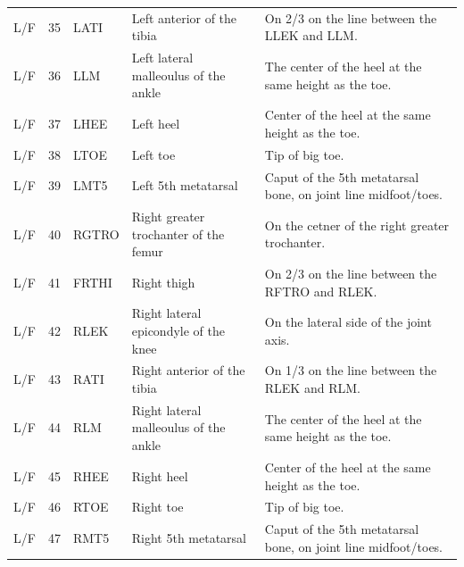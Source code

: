 \documentclass[fleqn,12pt]{wlpeerj}
\begin{document}
\begin{table}
\begin{tabular}{lrlll}
    L/F & 35 & LATI  & Left anterior of the tibia            & On 2/3 on the line between the LLEK and LLM. \\
    L/F & 36 & LLM   & Left lateral malleoulus of the ankle  & The center of the heel at the same height as the toe. \\
    L/F & 37 & LHEE  & Left heel                             & Center of the heel at the same height as the toe. \\
    L/F & 38 & LTOE  & Left toe                              & Tip of big toe. \\
    L/F & 39 & LMT5  & Left 5th metatarsal                   & Caput of the 5th metatarsal bone, on joint line midfoot/toes. \\
    L/F & 40 & RGTRO & Right greater trochanter of the femur & On the cetner of the right greater trochanter. \\
    L/F & 41 & FRTHI & Right thigh                           & On 2/3 on the line between the RFTRO and RLEK. \\
    L/F & 42 & RLEK  & Right lateral epicondyle of the knee  & On the lateral side of the joint axis. \\
    L/F & 43 & RATI  & Right anterior of the tibia           & On 1/3 on the line between the RLEK and RLM. \\
    L/F & 44 & RLM   & Right lateral malleoulus of the ankle & The center of the heel at the same height as the toe. \\
    L/F & 45 & RHEE  & Right heel                            & Center of the heel at the same height as the toe. \\
    L/F & 46 & RTOE  & Right toe                             & Tip of big toe. \\
    L/F & 47 & RMT5  & Right 5th metatarsal                  & Caput of the 5th metatarsal bone, on joint line midfoot/toes. \\
    \bottomrule
  \end{tabular}
  \label{tab:marker-labels}
\end{table}
\end{document}

